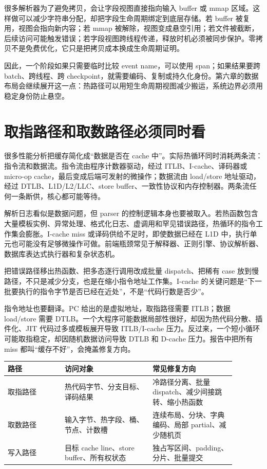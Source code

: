 很多解析器为了避免拷贝，会让字段视图直接指向输入 buffer 或 mmap 区域。这样做可以减少字符串分配，却把字段生命周期绑定到底层存储。若 buffer 被复用，视图会指向新内容；若 mmap 被解除，视图变成悬空引用；若文件被截断，后续访问可能触发错误；若字段视图跨线程传递，释放时机必须被同步保护。零拷贝不是免费优化，它只是把拷贝成本换成生命周期证明。

因此，一个阶段如果只需要临时比较 event name，可以使用 span；如果结果要跨 batch、跨线程、跨 checkpoint，就需要编码、复制或持久化身份。第六章的数据布局会继续展开这一点：热路径可以用短生命周期视图减少搬运，系统边界必须用稳定身份防止悬空。

\section{取指路径和取数路径必须同时看}

很多性能分析把缓存简化成“数据是否在 cache 中”。实际热循环同时消耗两条流：指令流和数据流。指令流由程序计数器驱动，经过 ITLB、I-cache、译码器或 micro-op cache，最后变成后端可发射的微操作；数据流由 load/store 地址驱动，经过 DTLB、L1D/L2/LLC、store buffer、一致性协议和内存控制器。两条流任何一条断供，核心都可能等待。

解析日志看似是数据问题，但 parser 的控制逻辑本身也要被取入。若热函数包含大量模板实例、异常处理、格式化日志、虚调用和罕见错误路径，热循环的指令工作集会膨胀。I-cache miss 或译码供给不足时，即使数据已经在 L1D 中，执行单元也可能没有足够微操作可做。前端瓶颈常见于解释器、正则引擎、协议解析器、数据库表达式执行器和复杂状态机。

把错误路径移出热函数、把多态逐行调用改成批量 dispatch、把稀有 case 放到慢路径，不只是减少分支，也是在缩小指令地址工作集。I-cache 的关键问题是“下一批要执行的指令字节是否已经在近处”，不是“代码行数是否少”。

指令地址也要翻译。PC 给出的是虚拟地址，取指路径需要 ITLB；数据 load/store 需要 DTLB。一个大程序可能数据局部性很好，却因为热代码分散、插件化、JIT 代码过多或模板展开导致 ITLB/I-cache 压力。反过来，一个短小循环可能取指稳定，却因随机数据访问导致 DTLB 和 D-cache 压力。报告中把所有 miss 都叫“缓存不好”，会掩盖修复方向。

\begin{center}
\begin{tabular}{p{0.22\linewidth}p{0.34\linewidth}p{0.32\linewidth}}
\toprule
路径 & 访问对象 & 常见修复方向 \\
\midrule
取指路径 & 热代码字节、分支目标、译码结果 & 冷路径分离、批量 dispatch、减少间接跳转、缩小热函数 \\
取数路径 & 输入字节、热字段、桶、节点、计数槽 & 连续布局、分块、字典编码、局部 partial、减少随机页 \\
写入路径 & 目标 cache line、store buffer、所有权状态 & 独占写区间、padding、分片、批量提交 \\
\bottomrule
\end{tabular}
\end{center}

